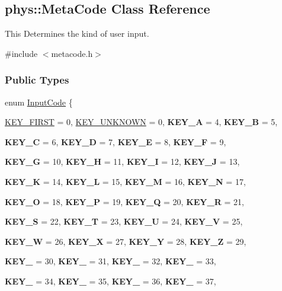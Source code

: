 \hypertarget{classphys_1_1MetaCode}{
\subsection{phys::MetaCode Class Reference}
\label{classphys_1_1MetaCode}
}


This Determines the kind of user input.  




{\ttfamily \#include $<$metacode.h$>$}

\subsubsection*{Public Types}
\begin{DoxyCompactItemize}
\item 
enum \hyperlink{classphys_1_1MetaCode_a3e501cbb5bf0f6f1fdb7211465bda8d8}{InputCode} \{ \par
\hyperlink{classphys_1_1MetaCode_a3e501cbb5bf0f6f1fdb7211465bda8d8a45d7f3824a440f5bea5e616a6d6ea0b5}{KEY\_\-FIRST} =  0, 
\hyperlink{classphys_1_1MetaCode_a3e501cbb5bf0f6f1fdb7211465bda8d8a061a36c9b5d9661314fd9d276b33042f}{KEY\_\-UNKNOWN} =  0, 
{\bfseries KEY\_\-A} =  4, 
{\bfseries KEY\_\-B} =  5, 
\par
{\bfseries KEY\_\-C} =  6, 
{\bfseries KEY\_\-D} =  7, 
{\bfseries KEY\_\-E} =  8, 
{\bfseries KEY\_\-F} =  9, 
\par
{\bfseries KEY\_\-G} =  10, 
{\bfseries KEY\_\-H} =  11, 
{\bfseries KEY\_\-I} =  12, 
{\bfseries KEY\_\-J} =  13, 
\par
{\bfseries KEY\_\-K} =  14, 
{\bfseries KEY\_\-L} =  15, 
{\bfseries KEY\_\-M} =  16, 
{\bfseries KEY\_\-N} =  17, 
\par
{\bfseries KEY\_\-O} =  18, 
{\bfseries KEY\_\-P} =  19, 
{\bfseries KEY\_\-Q} =  20, 
{\bfseries KEY\_\-R} =  21, 
\par
{\bfseries KEY\_\-S} =  22, 
{\bfseries KEY\_\-T} =  23, 
{\bfseries KEY\_\-U} =  24, 
{\bfseries KEY\_\-V} =  25, 
\par
{\bfseries KEY\_\-W} =  26, 
{\bfseries KEY\_\-X} =  27, 
{\bfseries KEY\_\-Y} =  28, 
{\bfseries KEY\_\-Z} =  29, 
\par
{\bfseries KEY\_} =  30, 
{\bfseries KEY\_} =  31, 
{\bfseries KEY\_} =  32, 
{\bfseries KEY\_} =  33, 
\par
{\bfseries KEY\_} =  34, 
{\bfseries KEY\_} =  35, 
{\bfseries KEY\_} =  36, 
{\bfseries KEY\_} =  37, 
\par

\end{DoxyCompactItemize}
